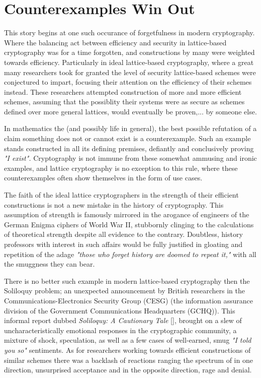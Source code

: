 \section{Counterexamples Win Out}


This story begins at one such occurance of forgetfulness in modern cryptography. Where the balancing act between efficiency and security in lattice-based cryptography was for a time forgotten, and constructions by many were weighted towards efficiency. Particularly in ideal lattice-based cryptography, where a great many researchers took for granted the level of security lattice-based schemes were conjectured to impart, focusing their attention on the efficiency of their schemes instead. These researchers attempted construction of more and more efficient schemes, assuming that the possiblity their systems were as secure as schemes defined over more general lattices, would eventually be proven,... by someone else. 


In mathematics the (and possibly life in general), the best possible refutation of a claim something does not or cannot exist is a counterexample. Such an example stands constructed in all its defining premises, defiantly and conclusively proving \emph{"I exist".} Cryptography is not immune from these somewhat ammusing and ironic examples, and lattice cryptography is no exception to this rule, where these counterexamples often show themselves in the form of use cases.


The faith of the ideal lattice cryptographers in the strength of their efficient constructions is not a new mistake in the history of cryptography. This assumption of strength is famously mirrored in the arogance of engineers of the German Enigma ciphers of World War II, stubbornly clinging to the calculations of theoretical strength despite all evidence to the contrary. Doubtless, history professors with interest in such affairs would be fully justified in gloating and repetition of the adage \emph{"those who forget history are doomed to repeat it,"} with all the smuggness they can bear. 


There is no better such example in modern lattice-based cryptography then the Soliloquy problem; an unexpected announcement by British researchers in the Communications-Electronics Security Group (CESG) (the information assurance division of the Government Communications Headquarters (GCHQ)). This informal report dubbed \textit{Soliloquy: A Cautionary Tale} [\cite{Cam20140}], brought on a slew of uncharacteristically emotional responses in the cryptographic community, a mixture of shock, speculation, as well as a few cases of well-earned, smug \emph{"I told you so"} sentiments. As for researchers working towards efficient constructions of similar schemes there was a backlash of reactions ranging the spectrum of in one direction, unsurprised acceptance and in the opposite direction, rage and denial. 


